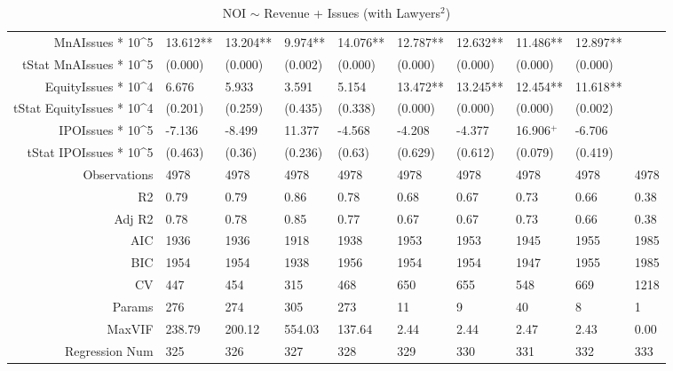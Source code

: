 \begin{table}[ht]
\begin{tabular}{rlllllllll}
  MnAIssues * 10^5 & 13.612** & 13.204** & 9.974** & 14.076** & 12.787** & 12.632** & 11.486** & 12.897** &  \\ 
  tStat MnAIssues * 10^5 & (0.000) & (0.000) & (0.002) & (0.000) & (0.000) & (0.000) & (0.000) & (0.000) &  \\ 
  EquityIssues * 10^4 & 6.676 & 5.933 & 3.591 & 5.154 & 13.472** & 13.245** & 12.454** & 11.618** &  \\ 
  tStat EquityIssues * 10^4 & (0.201) & (0.259) & (0.435) & (0.338) & (0.000) & (0.000) & (0.000) & (0.002) &  \\ 
  IPOIssues * 10^5 & -7.136 & -8.499 & 11.377 & -4.568 & -4.208 & -4.377 & 16.906$^{+}$ & -6.706 &  \\ 
  tStat IPOIssues * 10^5 & (0.463) & (0.36) & (0.236) & (0.63) & (0.629) & (0.612) & (0.079) & (0.419) &  \\ 
  Observations & 4978 & 4978 & 4978 & 4978 & 4978 & 4978 & 4978 & 4978 & 4978 \\ 
  R2 & 0.79 & 0.79 & 0.86 & 0.78 & 0.68 & 0.67 & 0.73 & 0.66 & 0.38 \\ 
  Adj R2 & 0.78 & 0.78 & 0.85 & 0.77 & 0.67 & 0.67 & 0.73 & 0.66 & 0.38 \\ 
  AIC & 1936 & 1936 & 1918 & 1938 & 1953 & 1953 & 1945 & 1955 & 1985 \\ 
  BIC & 1954 & 1954 & 1938 & 1956 & 1954 & 1954 & 1947 & 1955 & 1985 \\ 
  CV & 447 & 454 & 315 & 468 & 650 & 655 & 548 & 669 & 1218 \\ 
  Params & 276 & 274 & 305 & 273 & 11 & 9 & 40 & 8 & 1 \\ 
  MaxVIF & 238.79 & 200.12 & 554.03 & 137.64 & 2.44 & 2.44 & 2.47 & 2.43 & 0.00 \\ 
  Regression Num & 325 & 326 & 327 & 328 & 329 & 330 & 331 & 332 & 333 \\ 
   \hline
\end{tabular}
\caption{NOI $\sim$ Revenue + Issues (with Lawyers$^2$)} 
\end{table}
